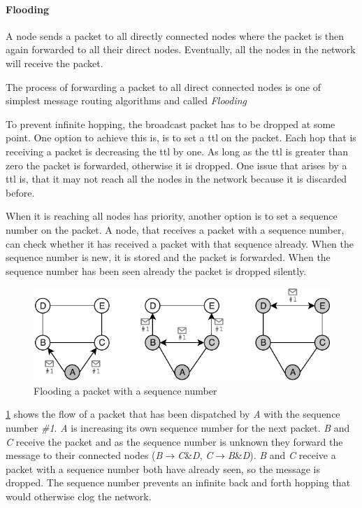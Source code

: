 \paragraph{Flooding}\label{flooding}
A node sends a packet to all directly connected nodes where the packet is then again forwarded to all their direct nodes. Eventually, all the nodes in the network will receive the packet. 

The process of forwarding a packet to all direct connected nodes is one of simplest message routing algorithms and called \textit{Flooding} \cite[p. 368]{tanenbaum_wetherall_2011}

To prevent infinite hopping, the broadcast packet has to be dropped at some point. One option to achieve this is, is to set a \gls{ttl} on the packet. Each hop that is receiving a packet is decreasing the \gls{ttl} by one. As long as the \gls{ttl} is greater than zero the packet is forwarded, otherwise it is dropped. One issue that arises by a \gls{ttl} is, that it may not reach all the nodes in the network because it is discarded before.

When it is reaching all nodes has priority, another option is to set a sequence number on the packet.
A node, that receives a packet with a sequence number, can check whether it has received a packet with that sequence already. When the sequence number is new, it is stored and the packet is forwarded. When the sequence number has been seen already the packet is dropped silently.

\begin{figure}
\centering
\includegraphics[width=1\textwidth]{graphics/flooding-with-sequence.pdf}
\caption{Flooding a packet with a sequence number}
\label{fig:flooding}
\end{figure}

\cref{fig:flooding} shows the flow of a packet that has been dispatched by \textit{A} with the sequence number \textit{\#1}. \textit{A} is increasing its own sequence number for the next packet. \textit{B} and \textit{C} receive the packet and as the sequence number is unknown they forward the message to their connected nodes (\textit{B}$\rightarrow$\textit{C}\&\textit{D},  \textit{C}$\rightarrow$\textit{B}\&\textit{D}). \textit{B} and \textit{C} receive a packet with a sequence number both have already seen, so the message is dropped. The sequence number prevents an infinite back and forth hopping that would otherwise clog the network.

